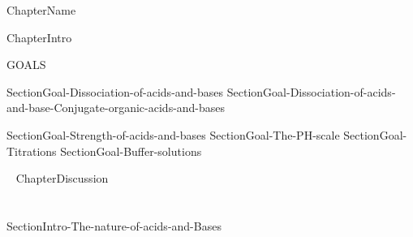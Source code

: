 \documentclass[main.tex]{subfiles}
\begin{document}
  {ChapterName}
       \begin{marginfigure}
\end{marginfigure}
   
  {ChapterIntro}
\begin{marginfigure}%
\begin{mytcbox}{GOALS}
\begin{enumerate}[label=\protect\circled{\color{white}\arabic*}]

{SectionGoal-Dissociation-of-acids-and-bases}
{SectionGoal-Dissociation-of-acids-and-base-Conjugate-organic-acids-and-bases}

{SectionGoal-Strength-of-acids-and-bases}
{SectionGoal-The-PH-scale}
{SectionGoal-Titrations}
{SectionGoal-Buffer-solutions}

\end{enumerate}
\end{mytcbox}
\vspace{1cm}
\begin{tcolorbox}[enhanced,colback=red!5!white,colframe=black!50!red,boxrule=1pt,
  arc=0pt,outer arc=0pt,drop heavy lifted shadow]
\faGears\ 
   {ChapterDiscussion}
\end{tcolorbox}
\end{marginfigure}%
\section{\color{blue!30!black}{The nature of acids and Bases}}{SectionIntro-The-nature-of-acids-and-Bases}
 
\end{document}
